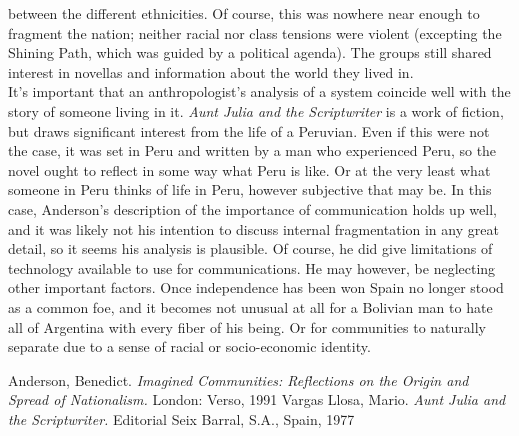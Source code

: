 \documentclass[12pt]{report}
\begin{document}
between the different ethnicities. Of course, this was nowhere near enough
to fragment the nation; neither racial nor class  tensions were violent
(excepting the Shining Path, which was guided by a political agenda). The
groups still shared interest in novellas and information about the world
they lived in.\\
\indent It's important that an anthropologist's analysis of a system
coincide well with the story of someone living in it. \emph{Aunt Julia and
the Scriptwriter} is a work of fiction, but draws significant interest from
the life of a Peruvian. Even if this were not the case, it was set in Peru
and written by a man who experienced Peru, so the novel
ought to reflect in some way what Peru is like. Or at the very least what
someone in Peru thinks of life in Peru, however subjective that may be. In this case, Anderson's description of the importance of communication holds up well, and it was likely not his intention to discuss internal fragmentation in any great detail, so it seems his analysis is plausible. Of course, he did give limitations of technology available to use for communications. He may however, be neglecting other important factors. Once
independence has been won Spain no longer stood as a common foe, and it becomes not unusual at all for a Bolivian man to hate all of Argentina with every fiber of his being. Or for communities to naturally separate due to a sense of racial or socio-economic identity.

\pagebreak
\begin{thebibliography}{99}
   Anderson, Benedict. \emph{Imagined Communities: Reflections on the Origin and Spread of Nationalism.} London: Verso, 1991
   Vargas Llosa, Mario. \emph{Aunt Julia and the Scriptwriter.} Editorial Seix Barral, S.A., Spain, 1977
\end{thebibliography}
\end{document}

